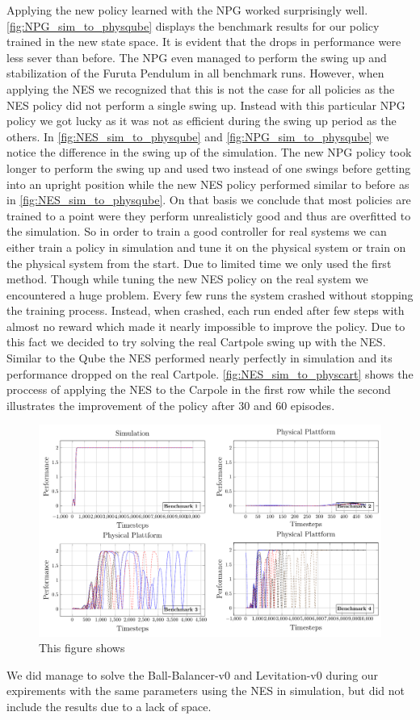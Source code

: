 Applying the new policy learned with the NPG worked surprisingly well. \autoref{fig:NPG_sim_to_physqube} displays the benchmark results for our policy trained in the new state space. It is evident that the drops in performance were less sever than before. The NPG even managed to perform the swing up and stabilization of the Furuta Pendulum in all benchmark runs. However, when applying the NES we recognized that this is not the case for all policies as the NES policy did not perform a single swing up. Instead with this particular NPG policy we got lucky as it was not as efficient during the swing up period as the others. In \autoref{fig:NES_sim_to_physqube} and \ref{fig:NPG_sim_to_physqube} we notice the difference in the swing up of the simulation. The new NPG policy took longer to perform the swing up and used two instead of one swings before getting into an upright position while the new NES policy performed similar to before as in \autoref{fig:NES_sim_to_physqube}. On that basis we conclude that most policies are trained to a point were they perform unrealisticly good and thus are overfitted to the simulation.
So in order to train a good controller for real systems we can either train a policy in simulation and tune it on the physical system or train on the physical system from the start. Due to limited time we only used the first method.
Though while tuning the new NES policy on the real system we encountered a huge problem. Every few runs the system crashed without stopping the training process. Instead, when crashed, each run ended after few steps with almost no reward which made it nearly impossible to improve the policy. Due to this fact we decided to try solving the real Cartpole swing up with the NES. Similar to the Qube the NES performed nearly perfectly in simulation and its performance dropped on the real Cartpole. \autoref{fig:NES_sim_to_physcart} shows the proccess of applying the NES to the Carpole in the first row while the second illustrates the improvement of the policy after 30 and 60 episodes.

\begin{figure}
\centering
\includegraphics[scale=.5]{plots/training_on_rr.pdf}
\caption{This figure shows}
\label{fig:NES_sim_to_physcart}
\end{figure}

We did manage to solve the Ball-Balancer-v0 and Levitation-v0 during our expirements with the same parameters using the NES in simulation, but did not include the results due to a lack of space.
